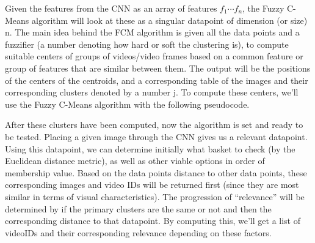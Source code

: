 \documentclass[10pt,twocolumn]{article}
\begin{document}
Given the features from the CNN as an array of features \(f_{1} \cdots f_{n}\), the Fuzzy C-Means algorithm will look at these as a singular datapoint of dimension (or size) n. The main idea behind the FCM algorithm is given all the data points and a fuzzifier (a number denoting how hard or soft the clustering is), to compute suitable centers of groups of videos/video frames based on a common feature or group of features that are similar between them. The output will be the positions of the centers of the centroids, and a corresponding table of the images and their corresponding clusters denoted by a number j. To compute these centers, we’ll use the Fuzzy C-Means algorithm with the following pseudocode.

	
	
	

After these clusters have been computed, now the algorithm is set and ready to be tested. Placing a given image through the CNN gives us a relevant datapoint. Using this datapoint, we can determine initially what basket to check (by the Euclidean distance metric), as well as other viable options in order of membership value. Based on the data points distance to other data points, these corresponding images and video IDs will be returned first (since they are most similar in terms of visual characteristics). The progression of “relevance” will be determined by if the primary clusters are the same or not and then the corresponding distance to that datapoint. By computing this, we’ll get a list of videoIDs and their corresponding relevance depending on these factors. 
\end{document}
